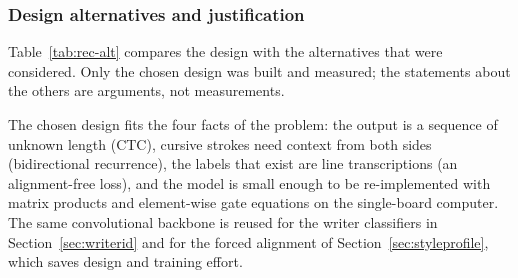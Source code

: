 \subsubsection{Design alternatives and justification}

Table~\ref{tab:rec-alt} compares the design with the alternatives that were considered.
Only the chosen design was built and measured; the statements about the others are arguments, not measurements.


The chosen design fits the four facts of the problem: the output is a sequence of unknown length (CTC), cursive strokes need context from both sides (bidirectional recurrence), the labels that exist are line transcriptions (an alignment-free loss), and the model is small enough to be re-implemented with matrix products and element-wise gate equations on the single-board computer.
The same convolutional backbone is reused for the writer classifiers in Section~\ref{sec:writerid} and for the forced alignment of Section~\ref{sec:styleprofile}, which saves design and training effort.
